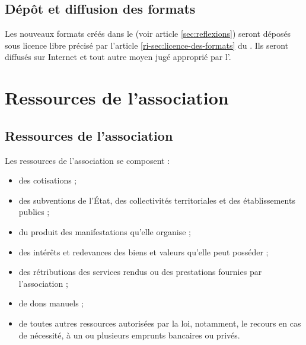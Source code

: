 \documentclass[a4paper,french,10pt]{article}
\newcommand{\article}[1]{\subsection{#1}\addtocounter{article}{1}}
\newcounter{article}
\newcommand{\artref}[1]{article \ref{#1}}
\newcommand{\artrefri}[1]{article \ref{ri-#1} du \RI{}}
\begin{document}
\article{Dépôt et diffusion des formats}
\label{sec:depot-et-diffusion}
Les nouveaux formats créés dans le \PA{} (voir \artref{sec:reflexions}) seront déposés sous licence libre précisé par l'\artrefri{sec:licence-des-formats}. Ils seront diffusés sur Internet et tout autre moyen jugé approprié par l'\AG{}.






\section{Ressources de l’association}

\article{Ressources de l’association}
\label{sec:ressources}
Les ressources de l’association se composent :
\begin{itemize}
\item des cotisations ;
  
\item des subventions de l’État, des collectivités territoriales et
des établissements publics ;

\item du produit des manifestations qu’elle organise ;

\item des intérêts et redevances des biens et valeurs qu’elle peut
posséder ;

\item des rétributions des services rendus ou des prestations fournies
par l'association ;

\item de dons manuels ;

\item de toutes autres ressources autorisées par la loi, notamment, le
recours en cas de nécessité, à un ou plusieurs emprunts bancaires ou
privés.
\end{itemize}
\end{document}

